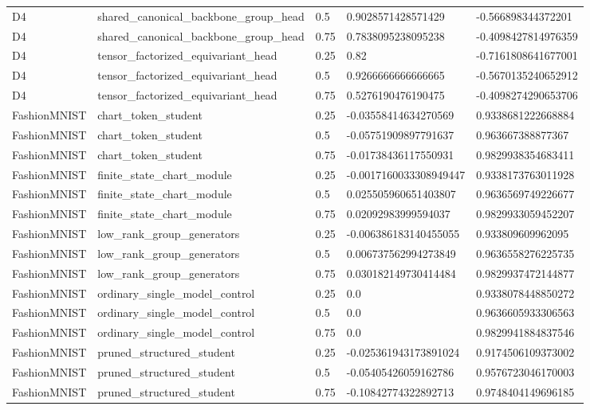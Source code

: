 \begin{table}[t]
\begin{tabular}{lllll}
D4 & shared\_canonical\_backbone\_group\_head & 0.5 & 0.9028571428571429 & -0.566898344372201 \\
D4 & shared\_canonical\_backbone\_group\_head & 0.75 & 0.7838095238095238 & -0.4098427814976359 \\
D4 & tensor\_factorized\_equivariant\_head & 0.25 & 0.82 & -0.7161808641677001 \\
D4 & tensor\_factorized\_equivariant\_head & 0.5 & 0.9266666666666665 & -0.5670135240652912 \\
D4 & tensor\_factorized\_equivariant\_head & 0.75 & 0.5276190476190475 & -0.4098274290653706 \\
FashionMNIST & chart\_token\_student & 0.25 & -0.03558414634270569 & 0.9338681222668884 \\
FashionMNIST & chart\_token\_student & 0.5 & -0.05751909897791637 & 0.963667388877367 \\
FashionMNIST & chart\_token\_student & 0.75 & -0.01738436117550931 & 0.9829938354683411 \\
FashionMNIST & finite\_state\_chart\_module & 0.25 & -0.0017160033308949447 & 0.9338173763011928 \\
FashionMNIST & finite\_state\_chart\_module & 0.5 & 0.025505960651403807 & 0.9636569749226677 \\
FashionMNIST & finite\_state\_chart\_module & 0.75 & 0.02092983999594037 & 0.9829933059452207 \\
FashionMNIST & low\_rank\_group\_generators & 0.25 & -0.006386183140455055 & 0.933809609962095 \\
FashionMNIST & low\_rank\_group\_generators & 0.5 & 0.006737562994273849 & 0.9636558276225735 \\
FashionMNIST & low\_rank\_group\_generators & 0.75 & 0.030182149730414484 & 0.9829937472144877 \\
FashionMNIST & ordinary\_single\_model\_control & 0.25 & 0.0 & 0.9338078448850272 \\
FashionMNIST & ordinary\_single\_model\_control & 0.5 & 0.0 & 0.9636605933306563 \\
FashionMNIST & ordinary\_single\_model\_control & 0.75 & 0.0 & 0.9829941884837546 \\
FashionMNIST & pruned\_structured\_student & 0.25 & -0.025361943173891024 & 0.9174506109373002 \\
FashionMNIST & pruned\_structured\_student & 0.5 & -0.05405426059162786 & 0.9576723046170003 \\
FashionMNIST & pruned\_structured\_student & 0.75 & -0.10842774322892713 & 0.9748404149696185 \\

\end{tabular}
\end{table}
